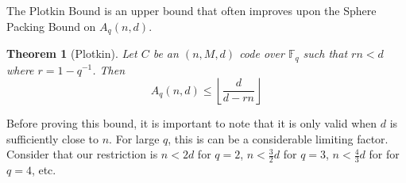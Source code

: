 \documentclass{article}
\newtheorem{theorem}{Theorem}
\theoremstyle{definition}
\numberwithin{exmp}{subsection}
\begin{document}
The Plotkin Bound is an upper bound that often improves upon the Sphere Packing Bound on $A_q(n,d)$.

\begin{theorem}[Plotkin]
Let $C$ be an $(n,M,d)$ code over $\mathbb{F}_q$ such that $rn < d$ where $r = 1 - q^{-1}$.  Then
\begin{equation}
A_q(n,d) \le \left \lfloor \frac{d}{d-rn}\right\rfloor
\end{equation}
\end{theorem}

Before proving this bound, it is important to note that it is only valid when $d$ is sufficiently close to $n$.  For large $q$, this is can be a considerable limiting factor.
Consider that our restriction is $n<2d$ for $q=2$, $n<\frac{3}{2}d$ for $q=3$, $n<\frac{4}{3}d$ for for $q=4$, etc.
\end{document}
